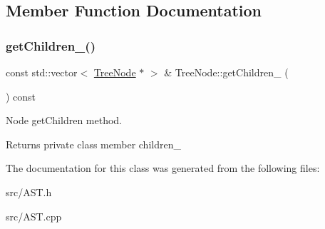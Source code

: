 \subsection{Member Function Documentation}
\hypertarget{class_tree_node_a8baa49dd046d1365dc85c85f12beda79}{}\label{class_tree_node_a8baa49dd046d1365dc85c85f12beda79} 
\subsubsection{\texorpdfstring{get\+Children\+\_\+()}{getChildren\_()}}
{\footnotesize\ttfamily const std\+::vector$<$ \hyperlink{class_tree_node}{Tree\+Node} $\ast$ $>$ \& Tree\+Node\+::get\+Children\+\_\+ (\begin{DoxyParamCaption}{ }\end{DoxyParamCaption}) const}



Node get\+Children method. 

\begin{DoxyReturn}{Returns}
private class member children\+\_\+ 
\end{DoxyReturn}


The documentation for this class was generated from the following files\+:\begin{DoxyCompactItemize}
\item 
src/A\+S\+T.\+h\item 
src/A\+S\+T.\+cpp\end{DoxyCompactItemize}

